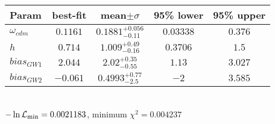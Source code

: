 \begin{tabular}{|l|c|c|c|c|} 
 \hline 
Param & best-fit & mean$\pm\sigma$ & 95\% lower & 95\% upper \\ \hline 
$\omega_{cdm }$ &$0.1161$ & $0.1881_{-0.11}^{+0.056}$ & $0.03338$ & $0.376$ \\ 
$h$ &$0.714$ & $1.009_{-0.16}^{+0.49}$ & $0.3706$ & $1.5$ \\ 
$bias_{GW 1 }$ &$2.044$ & $2.02_{-0.55}^{+0.35}$ & $1.13$ & $3.027$ \\ 
$bias_{GW 2 }$ &$-0.061$ & $0.4993_{-2.5}^{+0.77}$ & $-2$ & $3.585$ \\ 
\hline 
 \end{tabular} \\ 
$-\ln{\cal L}_\mathrm{min} =0.0021183$, minimum $\chi^2=0.004237$ \\ 
